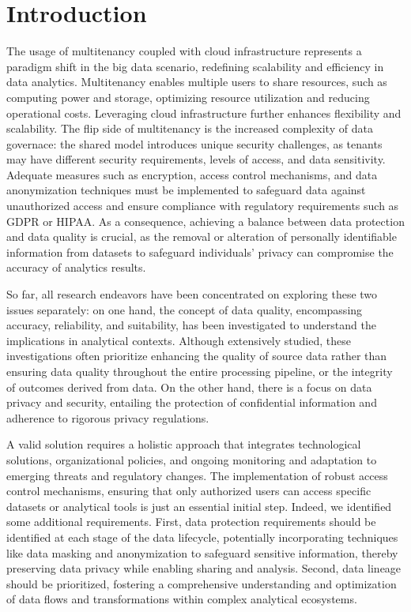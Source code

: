 \section{Introduction}
The usage of multitenancy coupled with cloud infrastructure represents a paradigm shift in the big data scenario, redefining scalability and efficiency in data analytics. Multitenancy enables multiple users to share resources, such as computing power and storage, optimizing resource utilization and reducing operational costs. Leveraging cloud infrastructure further enhances flexibility and scalability.
%
The flip side of multitenancy is the increased complexity of data governace: the shared model introduces unique security challenges, as tenants may have different security requirements, levels of access, and data sensitivity. Adequate measures such as encryption, access control mechanisms, and data anonymization techniques must be implemented to safeguard data against unauthorized access and ensure compliance with regulatory requirements such as GDPR or HIPAA.
%
As a consequence, achieving a balance between data protection and data quality is crucial, as the removal or alteration of personally identifiable information from datasets to safeguard individuals' privacy can compromise the accuracy of analytics results.

So far, all research endeavors have been concentrated on exploring these two issues separately: on one hand, the concept of data quality, encompassing accuracy, reliability, and suitability, has been investigated to understand the implications in analytical contexts. Although extensively studied, these investigations often prioritize enhancing the quality of source data rather than ensuring data quality throughout the entire processing pipeline, or the integrity of outcomes derived from data. On the other hand, there is a focus on data privacy and security, entailing the protection of confidential information and adherence to rigorous privacy regulations.

A valid solution requires a holistic approach that integrates technological solutions, organizational policies, and ongoing monitoring and adaptation to emerging threats and regulatory changes. The implementation of robust access control mechanisms, ensuring that only authorized users can access specific datasets or analytical tools is just an essential initial step.
Indeed, we identified some additional requirements. First, data protection requirements should be identified at each stage of the data lifecycle, potentially incorporating techniques like data masking and anonymization to safeguard sensitive information, thereby preserving data privacy while enabling sharing and analysis. Second, data lineage should be prioritized, fostering a comprehensive understanding and optimization of data flows and transformations within complex analytical ecosystems. 

